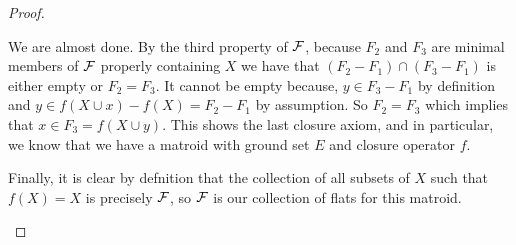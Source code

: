 \begin{proof}
\begin{enumerate}
     We are almost done. By the third property of $\mathcal{F}$, because $F_2$ and $F_3$ are minimal members of $\mathcal{F}$ properly containing $X$ we have that $(F_2-F_1)\cap (F_3 - F_1)$ is either empty or $F_2 = F_3$. It cannot be empty because, $y \in F_3 - F_1$ by definition and $y \in f(X\cup x)-f(X) = F_2 - F_1$ by assumption. So $F_2 = F_3$ which implies that $x \in F_3 = f(X \cup y).$ This shows the last closure axiom, and in particular, we know that we have a matroid with ground set $E$ and closure operator $f.$


     Finally, it is clear by defnition that the collection of all subsets of $X$ such that $f(X) = X$ is precisely $\mathcal{F}$, so $\mathcal{F}$ is our collection of flats for this matroid.
     
\end{enumerate}


    
\end{proof}